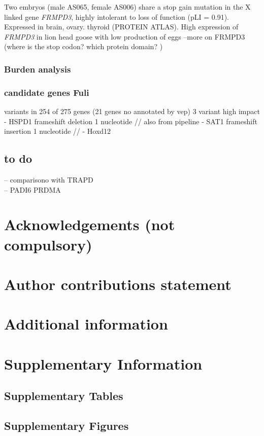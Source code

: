 \documentclass[fleqn,10pt]{wlscirep}
\newcommand{\beginsupplement}{%
        \setcounter{table}{0}
        \renewcommand{\thetable}{S\arabic{table}}%
        \setcounter{figure}{0}
        \renewcommand{\thefigure}{S\arabic{figure}}%
     }
\begin{document}
Two embryos (male AS065, female AS006) share a stop gain mutation in the X linked gene \textit{FRMPD3}, highly intolerant to loss of function (pLI = 0.91). Expressed in brain, ovary. thyroid (PROTEIN ATLAS). High expression of \textit{FRMPD3} in lion head goose with low production of eggs \cite{zhao2020genome} --more on FRMPD3 (where is the stop codon? which protein domain? )


\subsubsection*{Burden analysis }

\subsubsection*{candidate genes Fuli}
variants in 254 of 275  genes (21 genes no annotated by vep) 
3 variant high impact 
- HSPD1  frameshift  deletion 1 nucleotide  // also from pipeline 
- SAT1 frameshift insertion 1 nucleotide // 
- Hoxd12 


\subsection*{to do}
-- comparisono with TRAPD\\ 
-- PADI6 PRDMA\\





\section*{Acknowledgements (not compulsory)}
\section*{Author contributions statement}
\section*{Additional information}

\FloatBarrier


\FloatBarrier


\beginsupplement
\section*{Supplementary Information}
\subsection*{Supplementary Tables}

\subsection*{Supplementary Figures}

\end{document}
